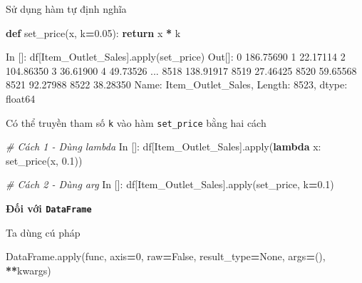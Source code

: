 \documentclass[
]{book}
\newenvironment{Shaded}{\begin{snugshade}}{\end{snugshade}}
\newcommand{\BuiltInTok}[1]{#1}
\newcommand{\CommentTok}[1]{\textcolor[rgb]{0.56,0.35,0.01}{\textit{#1}}}
\newcommand{\ControlFlowTok}[1]{\textcolor[rgb]{0.13,0.29,0.53}{\textbf{#1}}}
\newcommand{\DecValTok}[1]{\textcolor[rgb]{0.00,0.00,0.81}{#1}}
\newcommand{\FloatTok}[1]{\textcolor[rgb]{0.00,0.00,0.81}{#1}}
\newcommand{\KeywordTok}[1]{\textcolor[rgb]{0.13,0.29,0.53}{\textbf{#1}}}
\newcommand{\NormalTok}[1]{#1}
\newcommand{\OperatorTok}[1]{\textcolor[rgb]{0.81,0.36,0.00}{\textbf{#1}}}
\newcommand{\StringTok}[1]{\textcolor[rgb]{0.31,0.60,0.02}{#1}}
\newcommand{\VariableTok}[1]{\textcolor[rgb]{0.00,0.00,0.00}{#1}}
\begin{document}
Sử dụng hàm tự định nghĩa

\begin{Shaded}
\begin{Highlighting}[]
\KeywordTok{def}\NormalTok{ set\_price(x, k}\OperatorTok{=}\FloatTok{0.05}\NormalTok{):}
    \ControlFlowTok{return}\NormalTok{ x }\OperatorTok{*}\NormalTok{ k}
\end{Highlighting}
\end{Shaded}

\begin{Shaded}
\begin{Highlighting}[]
\NormalTok{In []: df[}\StringTok{\textquotesingle{}Item\_Outlet\_Sales\textquotesingle{}}\NormalTok{].}\BuiltInTok{apply}\NormalTok{(set\_price)}
\NormalTok{Out[]: }
\DecValTok{0}       \FloatTok{186.75690}
\DecValTok{1}        \FloatTok{22.17114}
\DecValTok{2}       \FloatTok{104.86350}
\DecValTok{3}        \FloatTok{36.61900}
\DecValTok{4}        \FloatTok{49.73526}
\NormalTok{          ...    }
\DecValTok{8518}    \FloatTok{138.91917}
\DecValTok{8519}     \FloatTok{27.46425}
\DecValTok{8520}     \FloatTok{59.65568}
\DecValTok{8521}     \FloatTok{92.27988}
\DecValTok{8522}     \FloatTok{38.28350}
\NormalTok{Name: Item\_Outlet\_Sales, Length: }\DecValTok{8523}\NormalTok{, dtype: float64}
\end{Highlighting}
\end{Shaded}

Có thể truyền tham số \texttt{k} vào hàm \texttt{set\_price} bằng hai cách

\begin{Shaded}
\begin{Highlighting}[]
\CommentTok{\# Cách 1 {-} Dùng lambda}
\NormalTok{In []: df[}\StringTok{\textquotesingle{}Item\_Outlet\_Sales\textquotesingle{}}\NormalTok{].}\BuiltInTok{apply}\NormalTok{(}\KeywordTok{lambda}\NormalTok{ x: set\_price(x, }\FloatTok{0.1}\NormalTok{))}

\CommentTok{\# Cách 2 {-} Dùng \textasciigrave{}arg\textasciigrave{}}
\NormalTok{In []: df[}\StringTok{\textquotesingle{}Item\_Outlet\_Sales\textquotesingle{}}\NormalTok{].}\BuiltInTok{apply}\NormalTok{(set\_price, k}\OperatorTok{=}\FloatTok{0.1}\NormalTok{)}
\end{Highlighting}
\end{Shaded}

\textbf{Đối với \texttt{DataFrame}}

Ta dùng cú pháp

\begin{Shaded}
\begin{Highlighting}[]
\NormalTok{DataFrame.}\BuiltInTok{apply}\NormalTok{(func, axis}\OperatorTok{=}\DecValTok{0}\NormalTok{, raw}\OperatorTok{=}\VariableTok{False}\NormalTok{, result\_type}\OperatorTok{=}\VariableTok{None}\NormalTok{, args}\OperatorTok{=}\NormalTok{(), }\OperatorTok{**}\NormalTok{kwargs)}
\end{Highlighting}
\end{Shaded}
\end{document}
